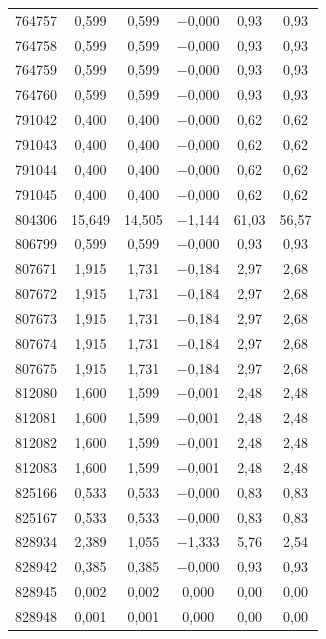 \begin{longtable}{lccccc}
764757 & 0,599 & 0,599 & $-$0,000 & 0,93 & 0,93 \\
764758 & 0,599 & 0,599 & $-$0,000 & 0,93 & 0,93 \\
764759 & 0,599 & 0,599 & $-$0,000 & 0,93 & 0,93 \\
764760 & 0,599 & 0,599 & $-$0,000 & 0,93 & 0,93 \\
791042 & 0,400 & 0,400 & $-$0,000 & 0,62 & 0,62 \\
791043 & 0,400 & 0,400 & $-$0,000 & 0,62 & 0,62 \\
791044 & 0,400 & 0,400 & $-$0,000 & 0,62 & 0,62 \\
791045 & 0,400 & 0,400 & $-$0,000 & 0,62 & 0,62 \\
804306 & 15,649 & 14,505 & $-$1,144 & 61,03 & 56,57 \\
806799 & 0,599 & 0,599 & $-$0,000 & 0,93 & 0,93 \\
807671 & 1,915 & 1,731 & $-$0,184 & 2,97 & 2,68 \\
807672 & 1,915 & 1,731 & $-$0,184 & 2,97 & 2,68 \\
807673 & 1,915 & 1,731 & $-$0,184 & 2,97 & 2,68 \\
807674 & 1,915 & 1,731 & $-$0,184 & 2,97 & 2,68 \\
807675 & 1,915 & 1,731 & $-$0,184 & 2,97 & 2,68 \\
812080 & 1,600 & 1,599 & $-$0,001 & 2,48 & 2,48 \\
812081 & 1,600 & 1,599 & $-$0,001 & 2,48 & 2,48 \\
812082 & 1,600 & 1,599 & $-$0,001 & 2,48 & 2,48 \\
812083 & 1,600 & 1,599 & $-$0,001 & 2,48 & 2,48 \\
825166 & 0,533 & 0,533 & $-$0,000 & 0,83 & 0,83 \\
825167 & 0,533 & 0,533 & $-$0,000 & 0,83 & 0,83 \\
828934 & 2,389 & 1,055 & $-$1,333 & 5,76 & 2,54 \\
828942 & 0,385 & 0,385 & $-$0,000 & 0,93 & 0,93 \\
828945 & 0,002 & 0,002 & 0,000 & 0,00 & 0,00 \\
828948 & 0,001 & 0,001 & 0,000 & 0,00 & 0,00 \\
\end{longtable}
\endgroup
